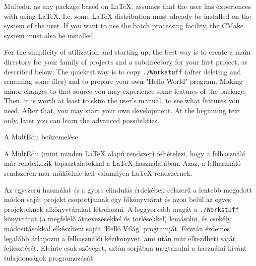 {
Multedu, as any package based on \LaTeX, assumes that the user has
experiences with using \LaTeX. I.e. some \LaTeX{} distribution must already be installed on the system of the user. If you want to use the
batch processing facility, the CMake system must also be installed.

For the simplicity of utilization and starting up, 
the best way is to create a main directory for your family of projects and a subdirectory for your first project, 
as described below. The quickest way is to copy \lstinline|./Workstuff| (after deleting and renaming some files)
and to prepare your own "Hello World" program.
Making minor changes to that source you may experience
some features of the package. Then, it is worth at least to skim the user's manual, to see what features you need. After that, you may start your own development.
At the beginning text only, later you can learn the advanced
possibilities.
}
{A MultEdu beüzemelése}
{
A MultEdu (mint minden \LaTeX{} alapú rendszer) feltételezi, hogy 
a felhasználó már rendelkezik tapasztalatokkal a \LaTeX{}  használatában.
Azaz, a felhasználó rendszerén már működnie kell valamilyen \LaTeX{}
rendszernek.

Az egyszerű használat és a gyors elindulás érdekében célszerű a 
lentebb megadott módon saját projekt csoportjainak egy főkönyvtárat és
azon belül az egyes projekteknek alkönyvtárakat létrehozni.
A leggyorsabb magát a \lstinline|./Workstuff| könyvtárat (a megfelelő átnevezésekkel és törlésekkel) lemásolni, és csekély 
módosításokkal elkészíteni saját 'Helló Világ' programját.
Ezután érdemes legalább átlapozni a
felhasználói kézikönyvet, ami után már elkezdheti saját fejlesztését.
Eleinte csak szöveget, aztán sorjában megtanulni a használni kívánt tulajdonságok programozását.
}


